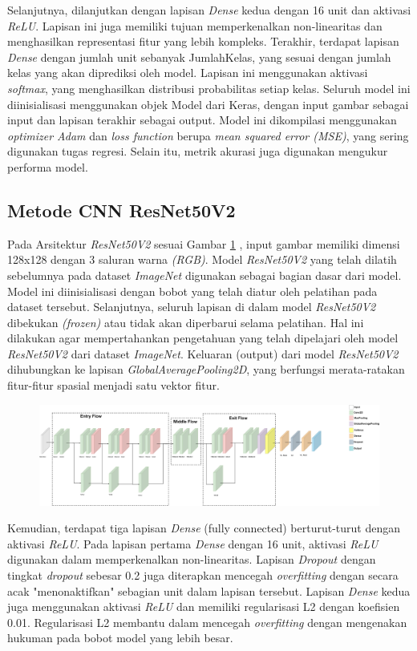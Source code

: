 Selanjutnya, dilanjutkan dengan lapisan \textit{Dense} kedua dengan 16 unit dan aktivasi \textit{ReLU}. Lapisan ini juga memiliki tujuan memperkenalkan non-linearitas dan menghasilkan representasi fitur yang lebih kompleks. Terakhir, terdapat lapisan \textit{Dense} dengan jumlah unit sebanyak JumlahKelas, yang sesuai dengan jumlah kelas yang akan diprediksi oleh model. Lapisan ini menggunakan aktivasi \textit{softmax}, yang menghasilkan distribusi probabilitas setiap kelas. Seluruh model ini diinisialisasi menggunakan objek Model dari Keras, dengan input gambar sebagai input dan lapisan terakhir sebagai output. Model ini dikompilasi menggunakan \textit{optimizer Adam} dan \textit{loss function} berupa\textit{ mean squared error (MSE)}, yang sering digunakan tugas regresi. Selain itu, metrik akurasi juga digunakan mengukur performa model.

\subsection{Metode CNN ResNet50V2}
Pada Arsitektur \textit{ResNet50V2} sesuai Gambar \ref{fig:textitResNet50V2} , input gambar memiliki dimensi 128x128 dengan 3 saluran warna \textit{(RGB)}. Model \textit{ResNet50V2} yang telah dilatih sebelumnya pada dataset \textit{ImageNet} digunakan sebagai bagian dasar dari model. Model ini diinisialisasi dengan bobot yang telah diatur oleh pelatihan pada dataset tersebut. Selanjutnya, seluruh lapisan di dalam model \textit{ResNet50V2} dibekukan \textit{(frozen)} atau tidak akan diperbarui selama pelatihan. Hal ini dilakukan agar mempertahankan pengetahuan yang telah dipelajari oleh model \textit{ResNet50V2} dari dataset \textit{ImageNet}. Keluaran (output) dari model \textit{ResNet50V2} dihubungkan ke lapisan \textit{GlobalAveragePooling2D}, yang berfungsi merata-ratakan fitur-fitur spasial menjadi satu vektor fitur.
\begin{figure}[hbt!]
	\centering
	\includegraphics[width=1.1\linewidth]{gambar/bener/Arsitektur_ModelCNNResNet50v2_Modifikasi.png}
	\label{fig:textitResNet50V2}
\end{figure}
Kemudian, terdapat tiga lapisan \textit{Dense} (fully connected) berturut-turut dengan aktivasi \textit{ReLU}. Pada lapisan pertama \textit{Dense} dengan 16 unit, aktivasi \textit{ReLU} digunakan dalam memperkenalkan non-linearitas. Lapisan \textit{Dropout} dengan tingkat \textit{dropout} sebesar 0.2 juga diterapkan mencegah \textit{overfitting} dengan secara acak "menonaktifkan" sebagian unit dalam lapisan tersebut. Lapisan \textit{Dense} kedua juga menggunakan aktivasi \textit{ReLU} dan memiliki regularisasi L2 dengan koefisien 0.01. Regularisasi L2 membantu dalam mencegah \textit{overfitting} dengan mengenakan hukuman pada bobot model yang lebih besar.

